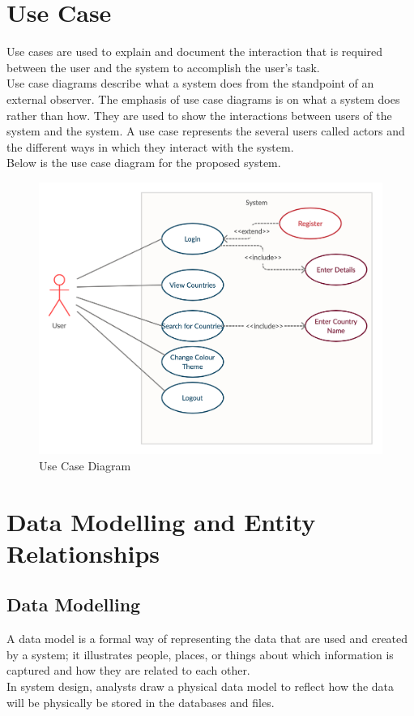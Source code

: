 \documentclass[twoside, a4paper, 12pt]{report}
\begin{document}
\section{Use Case}
Use cases are used to explain and document the interaction that is required between the user and the system to accomplish the user’s task.\\
\indent
Use case diagrams describe what a system does from the standpoint of an external observer. The emphasis of use case diagrams is on what a system does rather than how. They are used to show the interactions between users of the system and the system. A use case represents the several users called actors and the different ways in which they interact with the system.\\
\indent
Below is the use case diagram for the proposed system.
\begin{figure} [ht]
  \centering
  \includegraphics[width=1.0\textwidth]{Use Case.png}
  \caption{Use Case Diagram}
  \label{fig:useCaseDiagram}
\end{figure}

\section{Data Modelling and Entity Relationships}
\subsection{Data Modelling}
A data model is a formal way of representing the data that are used and created by a system; it illustrates people, places, or things about which information is captured and how they are related to each other.\\
\indent
In system design, analysts draw a physical data model to reflect how the data will be physically be stored in the databases and files.
\end{document}
